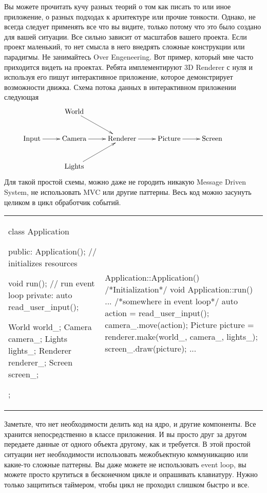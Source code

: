 Вы можете прочитать кучу разных теорий о том как писать то или иное приложение, о разных подходах к архитектуре или прочие тонкости.
Однако, не всегда следует применять все что вы видите, только потому что это было создано для вашей ситуации.
Все сильно зависит от масштабов вашего проекта.
Если проект маленький, то нет смысла в него внедрять сложные конструкции или парадигмы.
Не занимайтесь Over Engeneering.
Вот пример, который мне часто приходится видеть на проектах.
Ребята имплементируют 3D Renderer с нуля и используя его пишут интерактивное приложение, которое демонстрирует возможности движка.
Схема потока данных в интерактивном приложении следующая
\[
\xymatrix{
  {}&{\text{World}}\ar[dr]&{}&{}&{}&{}\\
  {\text{Input}}\ar[r]&{\text{Camera}}\ar[r]&{\text{Renderer}}\ar[r]&{\text{Picture}}\ar[r]&{\text{Screen}}&{}\\
  {}&{\text{Lights}}\ar[ur]&{}&{}&{}&{}\\
}
\]
Для такой простой схемы, можно даже не городить никакую Message Driven System, не использовать MVC или другие паттерны.
Весь код можно засунуть целиком в цикл обработчик событий.
\begin{center}
\begin{tabular}{ll}
{
\begin{minipage}[\baselineskip]{8cm}
\begin{cppcode}[numbers = none]
class Application {
public:
  Application(); // initializes resources
  
  void run(); // run event loop
private:
  auto read_user_input();

  World world_;
  Camera camera_;
  Lights lights_;
  Renderer renderer_;
  Screen screen_;
};
\end{cppcode}
\end{minipage}
}&{
\begin{minipage}[\baselineskip]{8cm}
\begin{cppcode}[numbers = none]
Application::Application() {
  /*Initialization*/
}
void Application::run() {
  ...
  /*somewhere in event loop*/
  auto action = read_user_input();
  camera_.move(action);
  Picture picture = renderer.make(world_,
                                  camera_,
                                  lights_);
  screen_.draw(picture);
  ...
}
\end{cppcode}
\end{minipage}
}\\
\end{tabular}
\end{center}
Заметьте, что нет необходимости делить код на ядро, и другие компоненты.
Все хранится непосредственно в классе приложения.
И вы просто друг за другом передаете данные от одного объекта другому, как и требуется.
В этой простой ситуации нет необходимости использовать межобъектную коммуникацию или какие-то сложные паттерны.
Вы даже можете не использовать event loop, вы можете просто крутиться в бесконечном цикле и опрашивать клавиатуру.
Нужно только защититься таймером, чтобы цикл не проходил слишком быстро и все.

